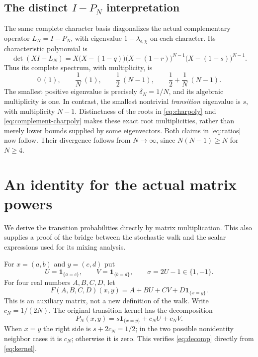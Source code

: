 \documentclass[11pt,a4paper]{article}
\theoremstyle{definition}
\theoremstyle{remark}
\newcommand{\ind}{\mathbf 1}
\begin{document}
\subsection{The distinct $I-P_N$ interpretation}

The same complete character basis diagonalizes the actual complementary
operator $L_N=I-P_N$, with eigenvalue $1-\lambda_{\epsilon,\chi}$ on each
character. Its characteristic polynomial is
\begin{equation}\label{eq:complement-charpoly}
\det(XI-L_N)
=X\bigl(X-(1-q)\bigr)
       \bigl(X-(1-r)\bigr)^{N-1}
       \bigl(X-(1-s)\bigr)^{N-1}.
\end{equation}
Thus its complete spectrum, with multiplicity, is
\[
0\ (1),\qquad \frac1N\ (1),\qquad
\frac12\ (N-1),\qquad \frac12+\frac1N\ (N-1).
\]
The smallest positive eigenvalue is precisely $\delta_N=1/N$, and its
algebraic multiplicity is one. In contrast, the smallest nontrivial
\emph{transition} eigenvalue is $s$, with multiplicity $N-1$.
Distinctness of the roots in \eqref{eq:charpoly} and
\eqref{eq:complement-charpoly} makes these exact root multiplicities,
rather than merely lower bounds supplied by some eigenvectors.
Both claims in \eqref{eq:ratios} now follow. Their divergence follows from
$N\to\infty$, since $N(N-1)\ge N$ for $N\ge4$.

\section{An identity for the actual matrix powers}

We derive the transition probabilities directly by matrix multiplication.
This also supplies a proof of the bridge between the stochastic walk and
the scalar expressions used for its mixing analysis.

For $x=(a,b)$ and $y=(c,d)$ put
\[
U=\ind_{\{a=c\}},\qquad V=\ind_{\{b=d\}},\qquad
\sigma=2U-1\in\{1,-1\}.
\]
For four real numbers $A,B,C,D$, let
\[
F(A,B,C,D)(x,y)=A+BU+CV+D\ind_{\{x=y\}}.
\]
This is an auxiliary matrix, not a new definition of the walk. Write
$c_N=1/(2N)$. The original transition kernel has the decomposition
\begin{equation}\label{eq:decomp}
P_N(x,y)=s\ind_{\{x=y\}}+c_N U+c_N V.
\end{equation}
When $x=y$ the right side is $s+2c_N=1/2$; in the two possible nonidentity
neighbor cases it is $c_N$; otherwise it is zero. This verifies
\eqref{eq:decomp} directly from \eqref{eq:kernel}.
\end{document}
